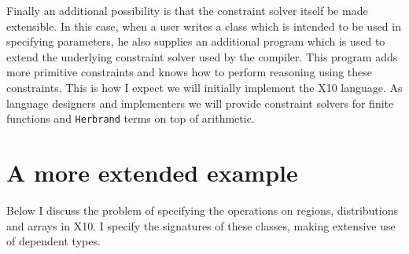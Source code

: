 \documentclass[fullpage]{article}
\def\Xten{{\sf X10}}
\begin{document}
Finally an additional possibility is that the constraint solver itself
be made extensible. In this case, when a user writes a class which is
intended to be used in specifying parameters, he also supplies an
additional program which is used to extend the underlying constraint
solver used by the compiler. This program adds more primitive
constraints and knows how to perform reasoning using these
constraints. This is how I expect we will initially implement the
\Xten{} language. As language designers and implementers we will
provide constraint solvers for finite functions and {\tt Herbrand}
terms on top of arithmetic. 

\section{A more extended example}
Below I discuss the problem of specifying the operations on regions,
distributions and arrays in \Xten. I specify the signatures of these
classes, making extensive use of dependent types.
\end{document}
